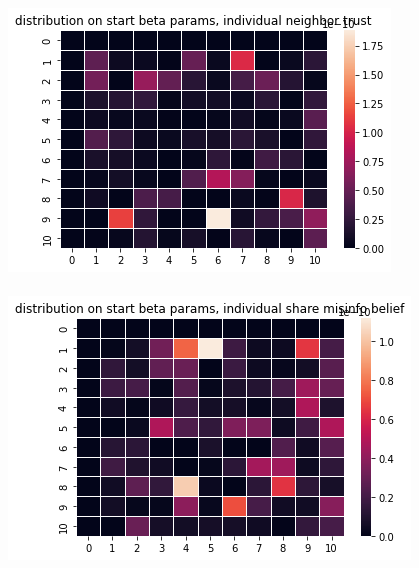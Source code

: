 \documentclass{article}
\begin{document}
\includegraphics{heatmap_neighbor_trust}
\\
\\
\includegraphics{heatmap_misinfo_belief}
\end{document}

